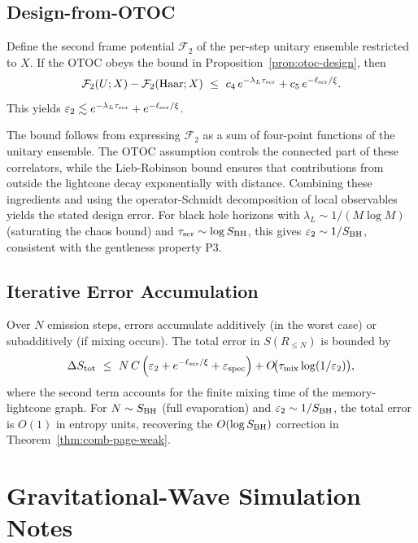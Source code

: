 \documentclass[11pt,a4paper]{article}
\theoremstyle{plain}
\theoremstyle{definition}
\theoremstyle{remark}
\begin{document}
\subsection{Design-from-OTOC}
Define the second frame potential $\mathcal{F}_2$ of the per-step unitary ensemble restricted to $X$. If the OTOC obeys the bound in Proposition~\ref{prop:otoc-design}, then
\begin{equation}
\mathcal{F}_2(U;X) - \mathcal{F}_2(\text{Haar};X) \ \le\ c_4\, e^{-\lambda_L \tau_{\rm scr}} + c_5\, e^{-\ell_{\rm scr}/\xi}.
\end{equation}
This yields $\varepsilon_2 \lesssim e^{-\lambda_L \tau_{\rm scr}} + e^{-\ell_{\rm scr}/\xi}$.

The bound follows from expressing $\mathcal{F}_2$ as a sum of four-point functions of the unitary ensemble. The OTOC assumption controls the connected part of these correlators, while the Lieb-Robinson bound ensures that contributions from outside the lightcone decay exponentially with distance. Combining these ingredients and using the operator-Schmidt decomposition of local observables yields the stated design error. For black hole horizons with $\lambda_L \sim 1/(M \log M)$ (saturating the chaos bound) and $\tau_{\rm scr} \sim \log S_{\rm BH}$, this gives $\varepsilon_2 \sim 1/S_{\rm BH}$, consistent with the gentleness property P3.

\subsection{Iterative Error Accumulation}
Over $N$ emission steps, errors accumulate additively (in the worst case) or subadditively (if mixing occurs). The total error in $S(R_{\le N})$ is bounded by
\begin{equation}
\Delta S_{\rm tot} \ \le\ N\, C\left(\varepsilon_2 + e^{-\ell_{\rm scr}/\xi} + \varepsilon_{\rm spec}\right) + O\!\big(\tau_{\rm mix} \log(1/\varepsilon_2)\big),
\end{equation}
where the second term accounts for the finite mixing time of the memory-lightcone graph. For $N \sim S_{\rm BH}$ (full evaporation) and $\varepsilon_2 \sim 1/S_{\rm BH}$, the total error is $O(1)$ in entropy units, recovering the $O(\log S_{\rm BH})$ correction in Theorem~\ref{thm:comb-page-weak}.


\section{Gravitational-Wave Simulation Notes}
\end{document}
